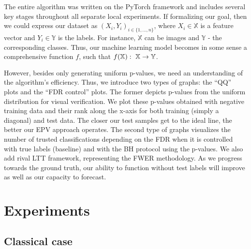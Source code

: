 \documentclass{article}
\begin{document}
The entire algorithm was written on the PyTorch framework and includes several key stages throughout all separate local experiments. If formalizing our goal, then we could express our dataset as $(X_i, Y_i)_{i\in\{1, ..., n\}}$, where $X_i \in \mathbb{X}$ is a feature vector and  $Y_i \in \mathbb{Y}$ is the labels. For instance, $\mathbb{X}$ can be images and $\mathbb{Y}$ - the corresponding classes. Thus, our machine learning model becomes in some sense a comprehensive function $f$, such that $\\ f(\mathbb{X}): \  \mathbb{X} \rightarrow \mathbb{Y}$.

However, besides only generating uniform p-values, we need an understanding of the algorithm’s efficiency. Thus, we introduce two types of graphs: the “QQ” plots and the “FDR control” plots. The former depicts p-values from the uniform distribution for visual verification. We plot these p-values obtained with negative training data and their rank along the x-axis for both training (simply a diagonal) and test data. The closer our test samples get to the ideal line, the better our EPV approach operates. The second type of graphs visualizes the number of trusted classifications depending on the FDR when it is controlled with true labels (baseline) and with the BH protocol using the p-values. We also add rival LTT framework, representing the FWER methodology. As we progress towards the ground truth, our ability to function without test labels will improve as well as our capacity to forecast.


\section{Experiments}

\subsection{Classical case}
\end{document}
